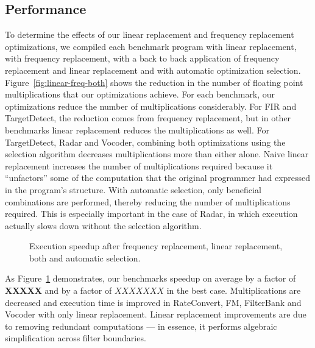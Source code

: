 \subsection{Performance}
To determine the effects of our linear replacement and frequency
replacement optimizations, we compiled each benchmark program with
linear replacement, with frequency replacement, with a back to back
application of frequency replacement and linear replacement and with
automatic optimization selection. Figure~\ref{fig:linear-freq-both}
shows the reduction in the number of floating point multiplications
that our optimizations achieve.  For each benchmark, our optimizations
reduce the number of multiplications considerably. For FIR and
TargetDetect, the reduction comes from frequency replacement, but in
other benchmarks linear replacement reduces the multiplications as
well. For TargetDetect, Radar and Vocoder, combining both
optimizations using the selection algorithm decreases multiplications
more than either alone. Naive linear replacement increases the number
of multiplications required because it ``unfactors'' some of the
computation that the original programmer had expressed in the
program's structure. With automatic selection, only beneficial
combinations are performed, thereby reducing the number of
multiplications required.  This is especially important in the case of
Radar, in which execution actually slows down without the selection
algorithm.

\begin{figure}[t]
\center
\epsfxsize=3.2in
\vspace{-6pt}
\caption{Execution speedup after 
  frequency replacement, linear replacement, both 
  and automatic selection.}
\label{fig:execution-speedup}
\vspace{-6pt}
\end{figure}


As Figure~\ref{fig:execution-speedup} demonstrates, our benchmarks
speedup on average by a factor of {\bf XXXXX} and by a factor of
$XXXXXXX$ in the best case.  
Multiplications are decreased and execution time is improved in
RateConvert, FM, FilterBank and Vocoder with only linear
replacement. Linear replacement improvements are due to removing
redundant computations --- in essence, it performs algebraic
simplification across filter boundaries.

